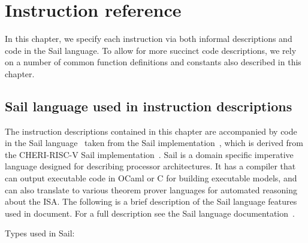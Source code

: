 \chapter{Instruction reference}
\label{chap:isaref-riscv}


\def\rvcheriasminsnref#1{#1}
\def\rvcheriasminsnnoref#1{#1}
\providecommand{\rvcheriasmfmt}{}
\renewcommand{\rvcheriasmfmt}[2][]{%
  #2%
  \ifthenelse{\equal{#1}{}}{%
  }{%
    ~{\textit{\footnotesize{(#1)}}}%
  }%
}

In this chapter, we specify each instruction via both informal descriptions
and code in the Sail language.
To allow for more succinct code descriptions, we rely on a number of
common function definitions and constants also described in this chapter.

\section{Sail language used in instruction descriptions}
\label{sec:sail-language-description}
The instruction descriptions contained in this chapter are accompanied
by code in the Sail language~\cite{sail-popl2019,sail-url} taken from the 
\cherimcu{} Sail implementation~\cite{cheriot-sail}, which is derived from the CHERI-RISC-V Sail
implementation~\cite{sail-cheri-riscv}.
Sail is a domain specific imperative language designed for describing
processor architectures.  It has a compiler that can output executable
code in OCaml or C for building executable models, and can also
translate to various theorem prover languages for automated reasoning
about the ISA.
The following is a brief description of the Sail language features used in document.
For a full description see the Sail language documentation~\cite{sail-url}.

Types used in Sail:

